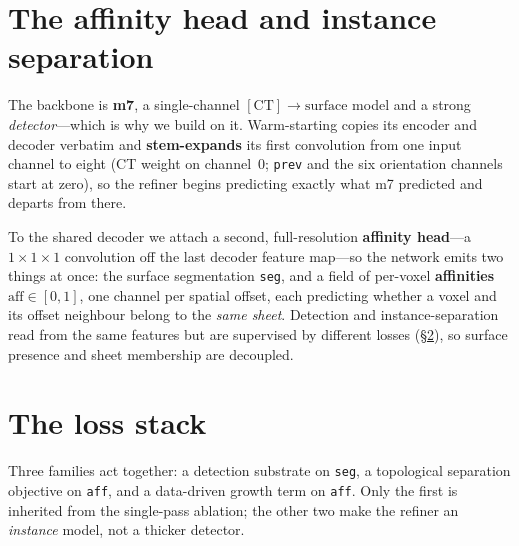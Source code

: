 \documentclass[10pt,twocolumn,a4paper]{article}
\newcommand{\code}[1]{\texttt{#1}}
\begin{document}
\section{The affinity head and instance separation}\label{sec:affinity}
The backbone is \textbf{m7}, a single-channel $[\mathrm{CT}]\to\mathrm{surface}$
model and a strong \emph{detector}---which is why we build on it. Warm-starting
copies its encoder and decoder verbatim and \textbf{stem-expands} its first
convolution from one input channel to eight (CT weight on channel~0; \code{prev}
and the six orientation channels start at zero), so the refiner begins predicting
exactly what m7 predicted and departs from there.

To the shared decoder we attach a second, full-resolution \textbf{affinity
head}---a $1\times1\times1$ convolution off the last decoder feature map---so the
network emits two things at once: the surface segmentation \code{seg}, and a
field of per-voxel \textbf{affinities} $\mathrm{aff}\in[0,1]$, one channel per
spatial offset, each predicting whether a voxel and its offset neighbour belong
to the \emph{same sheet}. Detection and instance-separation read from the same
features but are supervised by different losses (\S\ref{sec:loss}), so surface
presence and sheet membership are decoupled.

\section{The loss stack}\label{sec:loss}
Three families act together: a detection substrate on \code{seg}, a topological
separation objective on \code{aff}, and a data-driven growth term on \code{aff}.
Only the first is inherited from the single-pass ablation; the other two make the
refiner an \emph{instance} model, not a thicker detector.
\end{document}
